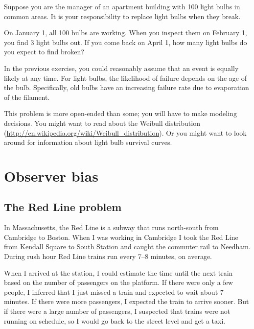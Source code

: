 \documentclass[12pt]{book}
\begin{document}
\begin{exercise}

Suppose you are the manager of an apartment building with
100 light bulbs in common areas.  It is your responsibility
to replace light bulbs when they break.

On January 1, all 100 bulbs are working.  When you inspect
them on February 1, you find 3 light bulbs out.  If you
come back on April 1, how many light bulbs do you expect to
find broken?

In the previous exercise, you could reasonably assume that an event is
equally likely at any time.  For light bulbs, the likelihood of
failure depends on the age of the bulb.  Specifically, old bulbs
have an increasing failure rate due to evaporation of the filament.

This problem is more open-ended than some; you will have to make
modeling decisions.  You might want to read about the Weibull
distribution
(\url{http://en.wikipedia.org/wiki/Weibull_distribution}).
Or you might want to look around for information about
light bulb survival curves.

\end{exercise}


\chapter{Observer bias}
\label{observer}

\section{The Red Line problem}

In Massachusetts, the Red Line is a subway that runs north-south from
Cambridge to Boston.  When I was working in Cambridge I took the Red
Line from Kendall Square to South Station and caught the commuter rail
to Needham.  During rush hour Red Line trains run every 7--8
minutes, on average.

When I arrived at the station, I could estimate the time until
the next train based on the number of passengers on the platform.
If there were only a few people, I inferred that I just missed
a train and expected to wait about 7 minutes.  If there were
more passengers, I expected the train to arrive sooner.  But if
there were a large number of passengers, I suspected that
trains were not running on schedule, so I would go back to the
street level and get a taxi.
\end{document}
